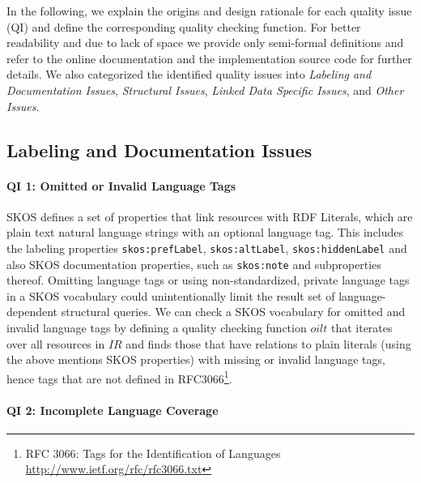 In the following, we explain the origins and design rationale for each quality issue (QI) and define the corresponding quality checking function. For better readability and due to lack of space we provide only semi-formal definitions and refer to the online documentation and the implementation source code for further details. We also categorized the identified quality issues into \emph{Labeling and Documentation Issues}, \emph{Structural Issues}, \emph{Linked Data Specific Issues}, and \emph{Other Issues}. 



\subsection{Labeling and Documentation Issues}

\paragraph{QI 1: Omitted or Invalid Language Tags}

SKOS defines a set of properties that link resources with RDF Literals, which are plain text natural language strings with an optional language tag. This includes the labeling properties \texttt{skos:prefLabel}, \texttt{skos:altLabel}, \texttt{skos:hiddenLabel} and also SKOS documentation properties, such as \texttt{skos:note} and subproperties thereof. Omitting language tags or using non-standardized, private language tags in a SKOS vocabulary could unintentionally limit the result set of language-dependent structural queries.
We can check a SKOS vocabulary for omitted and invalid language tags by defining a quality checking function $oilt$ that iterates over all resources in $IR$ and finds those that have relations to plain literals (using the above mentions SKOS properties) with missing or invalid language tags, hence tags that are not defined in RFC3066\footnote{RFC 3066: Tags for the Identification of Languages \url{http://www.ietf.org/rfc/rfc3066.txt}}.

\paragraph{QI 2: Incomplete Language Coverage}

